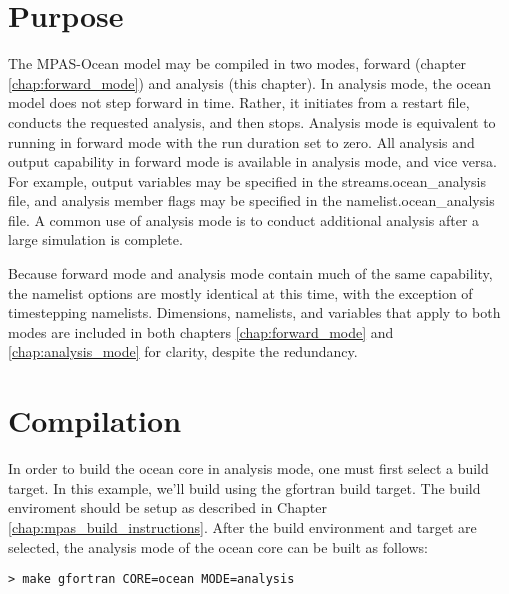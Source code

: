 \section{Purpose}
\label{sec:analysis_purpose}

The MPAS-Ocean model may be compiled in two modes, forward (chapter \ref{chap:forward_mode}) and analysis (this chapter).  In analysis mode, the ocean model does not step forward in time.  Rather, it initiates from a restart file, conducts the requested analysis, and then stops.  Analysis mode is equivalent to running in forward mode with the run duration set to zero.  All analysis and output capability in forward mode is available in analysis mode, and vice versa.  For example, output variables may be specified in the streams.ocean\_analysis file, and analysis member flags may be specified in the namelist.ocean\_analysis file.  A common use of analysis mode is to conduct additional analysis after a large simulation is complete.

Because forward mode and analysis mode contain much of the same capability, the namelist options are mostly identical at this time, with the exception of timestepping namelists.  Dimensions, namelists, and variables that apply to both modes are included in both chapters \ref{chap:forward_mode} and \ref{chap:analysis_mode} for clarity, despite the redundancy.

\section{Compilation}
\label{sec:analysis_compilation}

In order to build the ocean core in analysis mode, one must first select a
build target. In this example, we'll build using the gfortran build target. The
build enviroment should be setup as described in Chapter
\ref{chap:mpas_build_instructions}. After the build environment and target are
selected, the analysis mode of the ocean core can be built as follows:

\vspace{12pt}
{\tt > make gfortran CORE=ocean MODE=analysis}

